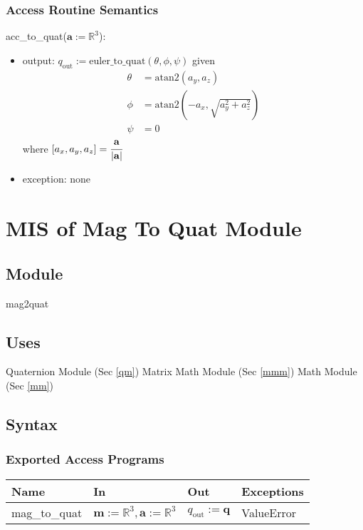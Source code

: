 \documentclass[12pt, titlepage]{article}
\begin{document}
\subsubsection{Access Routine Semantics}

\noindent acc\_to\_quat($\mathbf{a}:=\mathbb{R}^3$):
\begin{itemize}
\item output: $q_\text{out}:= \text{euler\_to\_quat}(\theta, \phi, \psi)$ given
\begin{align*}
  \theta &= \text{atan2}(a_y, a_z) \\
  \phi &= \text{atan2}(-a_x, \sqrt{a_y^2+a_z^2}) \\
  \psi &= 0
\end{align*}
where $[a_x, a_y, a_z] = \cfrac{\mathbf{a}}{|\mathbf{a}|}$
\item exception: none
\end{itemize}

\newpage

\section{MIS of Mag To Quat Module} \label{iqewmm}

\subsection{Module}
mag2quat

\subsection{Uses}
Quaternion Module (Sec \ref{qm})\newline
Matrix Math Module (Sec \ref{mmm}) \newline
Math Module (Sec \ref{mm})

\subsection{Syntax}

\subsubsection{Exported Access Programs}

\begin{center}
\begin{tabular}{p{3cm} p{4cm} p{3cm} p{2cm}}
\hline
\textbf{Name} & \textbf{In} & \textbf{Out} & \textbf{Exceptions} \\
\hline
mag\_to\_quat & $\mathbf{m}:=\mathbb{R}^3, \mathbf{a}:=\mathbb{R}^3$ & $q_\text{out} := \mathbf{q}$ & ValueError \\
\hline
\end{tabular}
\end{center}
\end{document}
